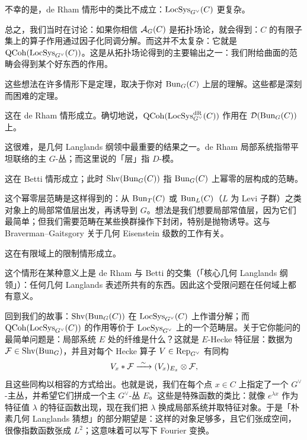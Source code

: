 不幸的是，de Rham 情形中的类比不成立：$\mathrm{LocSys}_{G^\vee}(C)$ 更复杂。

总之，我们当时在讨论：如果你相信 $\mathcal{A}_G(C)$ 是拓扑场论，就会得到：$C$ 的有限子集上的算子作用通过因子化同调分解。而这并不太复杂：它就是 $\mathrm{QCoh}(\mathrm{LocSys}_{G^\vee}(C))$。这是从拓扑场论得到的主要输出之一：我们附给曲面的范畴会得到某个好东西的作用。

这些想法在许多情形下是定理，取决于你对 $\mathrm{Bun}_G(C)$ 上层的理解。这些都是深刻而困难的定理。

\begin{theorem}
这在 de Rham 情形成立。确切地说，$\mathrm{QCoh}(\mathrm{LocSys}^{\mathrm{dR}}_{G^\vee}(C))$ 作用在 $\mathcal{D}(\mathrm{Bun}_G(C))$ 上。
\end{theorem}

这很难，是几何 Langlands 纲领中最重要的结果之一。de Rham 局部系统指带平坦联络的主 $G$-丛；而这里说的「层」指 $D$-模。


\begin{theorem}
这在 Betti 情形成立；此时 $\mathrm{Shv}(\mathrm{Bun}_G(C))$ 指 $\mathrm{Bun}_G(C)$ 上幂零的层构成的范畴。
\end{theorem}

这个幂零层范畴是这样得到的：从 $\mathrm{Bun}_T(C)$ 或 $\mathrm{Bun}_L(C)$（$L$ 为 Levi 子群）之类对象上的局部常值层出发，再诱导到 $G$。想法是我们想要局部常值层，因为它们最简单；但我们需要范畴在某些换群操作下封闭，特别是抛物诱导。这与 Braverman–Gaitsgory 关于几何 Eisenstein 级数的工作有关。

\begin{theorem}
这在有限域上的限制情形成立。
\end{theorem}

这个情形在某种意义上是 de Rham 与 Betti 的交集（「核心几何 Langlands 纲领」）：任何几何 Langlands 表述所共有的东西。因此这个受限问题在任何域上都有意义。

回到我们的故事：$\mathrm{Shv}(\mathrm{Bun}_G(C))$ 在 $\mathrm{LocSys}_{G^\vee}(C)$ 上作谱分解；而 $\mathrm{QCoh}(\mathrm{LocSys}_{G^\vee}(C))$ 的作用等价于 $\mathrm{LocSys}_{G^\vee}$ 上的一个范畴层。关于它你能问的最简单问题是：局部系统 $E$ 处的纤维是什么？这就是 $E$-Hecke 特征层：数据为 $\mathcal{F}\in\mathrm{Shv}(\mathrm{Bun}_G)$，并且对每个 Hecke 算子 $V\in\operatorname{Rep}_{G^\vee}$ 有同构
\[
V_x*\cF\xrightarrow{\ \sim\ }(V_x)_{E_x}\otimes\cF,
\]
且这些同构以相容的方式给出。也就是说，我们在每个点 $x\in C$ 上指定了一个 $G^\vee$-主丛，并希望它们拼成一个主 $G^\vee$-丛 $E$。这些是特殊函数的类比：就像 $e^{\lambda x}$ 作为特征值 $\lambda$ 的特征函数出现，现在我们把 $\lambda$ 换成局部系统并取特征对象。于是「朴素几何 Langlands 猜想」的部分期望是：这样的对象足够多，且它们张成空间，很像指数函数张成 $L^2$；这意味着可以写下 Fourier 变换。

